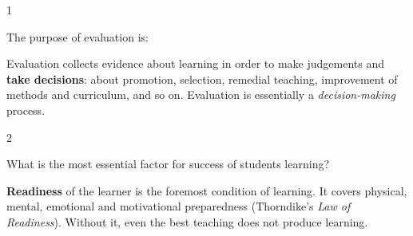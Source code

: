 \begin{question}{1}
{The purpose of evaluation is:\par}
\begin{explain}
Evaluation collects evidence about learning in order to make judgements and \textbf{take decisions}: about promotion, selection, remedial teaching, improvement of methods and curriculum, and so on. Evaluation is essentially a \emph{decision-making} process.
\end{explain}
\end{question}

\begin{question}{2}
{What is the most essential factor for success of students learning?\par}
\begin{explain}
\textbf{Readiness} of the learner is the foremost condition of learning. It covers physical, mental, emotional and motivational preparedness (Thorndike's \emph{Law of Readiness}). Without it, even the best teaching does not produce learning.
\end{explain}
\end{question}

